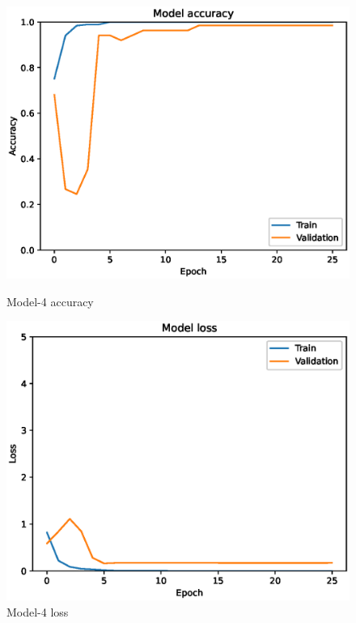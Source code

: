 \begin{figure}
    \centering
    \begin{minipage}{0.45\textwidth}
        \centering
        \includegraphics[width=\textwidth]{./fig/model4/accuracy4.eps}
        \caption{Model-4 accuracy}
        \label{fig:model4_accuracy}
    \end{minipage}
    \begin{minipage}{0.45\textwidth}
        \centering
        \includegraphics[width=\textwidth]{./fig/model4/loss4.eps}
        \caption{Model-4 loss}
        \label{fig:model4_loss}
    \end{minipage}
\end{figure}

